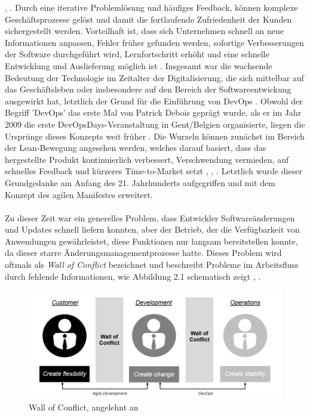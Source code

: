 \cite{bakaji_waterfall_2012}, \cite[S. 18]{ravichandran_devops_2016}. Durch eine iterative Problemlösung und häufiges Feedback, können komplexe Geschäftsprozesse gelöst und damit die fortlaufende Zufriedenheit der Kunden sichergestellt werden. Vorteilhaft ist, dass sich Unternehmen schnell an neue Informationen anpassen, Fehler früher gefunden werden, sofortige Verbesserungen der Software durchgeführt wird, Lernfortschritt erhöht und eine schnelle Entwicklung und Auslieferung möglich ist \cite[S. 18]{ravichandran_devops_2016}. Insgesamt war die wachsende Bedeutung der Technologie im Zeitalter der Digitalisierung, die sich mittelbar auf das Geschäftsleben oder insbesondere auf den Bereich der Softwareentwickung ausgewirkt hat, letztlich der Grund für die Einführung von DevOps \cite{haffke_transformative_2017}. Obwohl der Begriff 'DevOps' das erste Mal von Patrick Debois geprägt wurde, als er im Jahr 2009 die erste DevOpsDays-Veranstaltung in Gent/Belgien organisierte, liegen die Ursprünge dieses Konzepts weit früher \cite[S.3]{kim_devops-handbuch_2017}. Die Wurzeln können zunächst im Bereich der Lean-Bewegung angesehen werden, welches darauf basiert, dass das hergestellte Produkt kontinuierlich verbessert, Verschwendung vermieden, auf schnelles Feedback und kürzeres Time-to-Market setzt \cite[S.2]{kim_devops-handbuch_2017}, \cite{nelson_devops_2016}, \cite[S. 11]{ravichandran_devops_2016}. Letztlich wurde dieser Grundgedanke am Anfang des 21. Jahrhunderts aufgegriffen und mit dem Konzept des agilen Manifestes \cite{beck_manifesto_2001} erweitert.\\\\ Zu dieser Zeit war ein generelles Problem, dass Entwickler Softwareänderungen und Updates schnell liefern konnten, aber der Betrieb, der die Verfügbarkeit von Anwendungen gewährleistet, diese Funktionen nur langsam bereitstellen konnte, da dieser starre Änderungsmanagementprozesse hatte. Dieses Problem wird oftmals als \textit{Wall of Conflict} bezeichnet und beschreibt Probleme im Arbeitsfluss durch fehlende Informationen, wie Abbildung 2.1 schematisch zeigt \cite{kawaguchi_wall_2020}, \cite[S. 26]{huttermann_devops_2012}. 

\begin{figure}[h]
    \centering
    \includegraphics[scale=0.6]{Bilder/Wall of Conflict.png}
    \caption{Wall of Conflict, angelehnt an \cite{hering_devops_2018}}
\end{figure}

